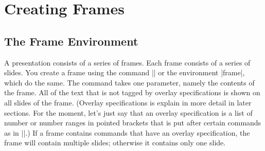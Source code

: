 
%

\section{Creating Frames}

\label{section-frames}

\subsection{The Frame Environment}

A presentation consists of a series of frames. Each frame consists of
a series of slides. You create a frame using the command
|\frame| or the environment |frame|, which do the same. The command
takes one parameter, namely the contents of the frame. All of the
text that is not tagged by overlay specifications is shown on all
slides of the frame. (Overlay specifications is explain
in more detail in later sections. For the moment, let's just say
that an overlay specification is a list of number or number ranges in
pointed brackets that is put after certain commands as in
||.) If a frame contains commands that have an
overlay specification, the frame will contain multiple slides;
otherwise it contains only one slide.

